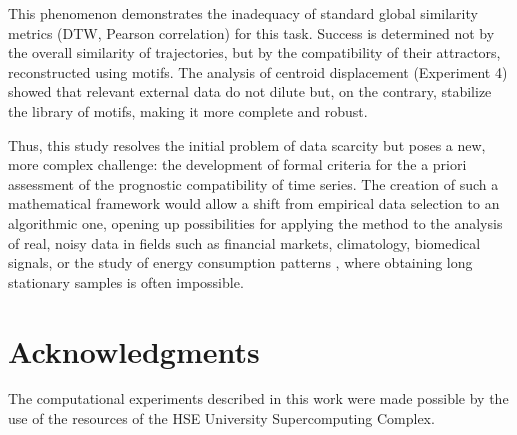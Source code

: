 \documentclass[a4paper,12pt]{extarticle}
\begin{document}
This phenomenon demonstrates the inadequacy of standard global similarity metrics (DTW, Pearson correlation) for this task. Success is determined not by the overall similarity of trajectories, but by the compatibility of their attractors, reconstructed using motifs. The analysis of centroid displacement (Experiment 4) showed that relevant external data do not dilute but, on the contrary, stabilize the library of motifs, making it more complete and robust.

Thus, this study resolves the initial problem of data scarcity but poses a new, more complex challenge: the development of formal criteria for the a priori assessment of the prognostic compatibility of time series. The creation of such a mathematical framework would allow a shift from empirical data selection to an algorithmic one, opening up possibilities for applying the method to the analysis of real, noisy data in fields such as financial markets, climatology, biomedical signals, or the study of energy consumption patterns \cite{PerezChacon2018}, where obtaining long stationary samples is often impossible.

\section{Acknowledgments}
The computational experiments described in this work were made possible by the use of the resources of the HSE University Supercomputing Complex.

\newpage
\printbibliography[title={References}]
\end{document}
